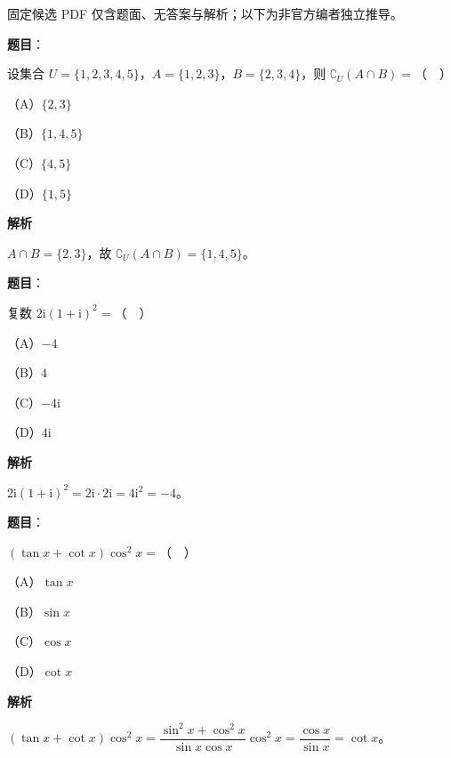 

\begin{gktip}
固定候选 PDF 仅含题面、无答案与解析；以下为非官方编者独立推导。
\end{gktip}

\begin{answer}

\textbf{题目}：

设集合 $U=\{1,2,3,4,5\}$，$A=\{1,2,3\}$，$B=\{2,3,4\}$，则 $\complement_U(A\cap B)=$（　）

（A）$\{2,3\}$

（B）$\{1,4,5\}$

（C）$\{4,5\}$

（D）$\{1,5\}$

\textbf{解析}

$A\cap B=\{2,3\}$，故 $\complement_U(A\cap B)=\{1,4,5\}$。


\end{answer}
\begin{answer}

\textbf{题目}：

复数 $2\mathrm i(1+\mathrm i)^2=$（　）

（A）$-4$

（B）$4$

（C）$-4\mathrm i$

（D）$4\mathrm i$

\textbf{解析}

$2\mathrm i(1+\mathrm i)^2=2\mathrm i\cdot2\mathrm i=4\mathrm i^2=-4$。


\end{answer}
\begin{answer}

\textbf{题目}：

$(\tan x+\cot x)\cos^2x=$（　）

（A）$\tan x$

（B）$\sin x$

（C）$\cos x$

（D）$\cot x$

\textbf{解析}

$(\tan x+\cot x)\cos^2x=\dfrac{\sin^2x+\cos^2x}{\sin x\cos x}\cos^2x=\dfrac{\cos x}{\sin x}=\cot x$。


\end{answer}
